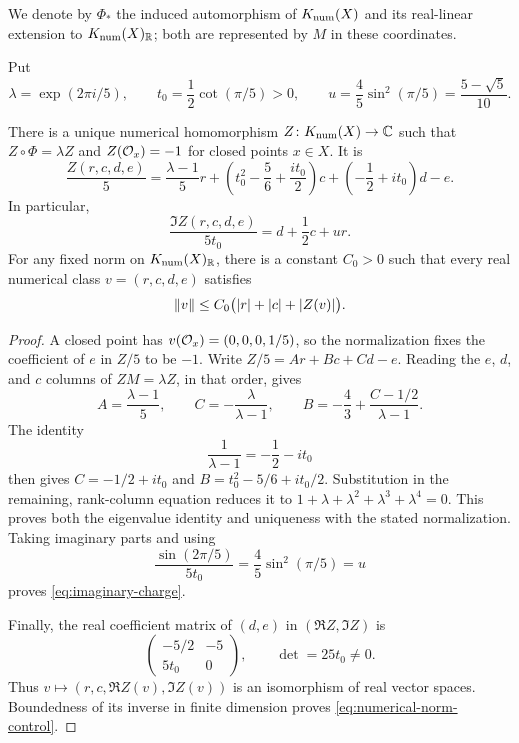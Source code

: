 We denote by $\Phi_*$ the induced automorphism of $K_{\mathrm{num}}(X)$ and its
real-linear extension to $K_{\mathrm{num}}(X)_{\mathbb R}$; both are represented by $M$ in
these coordinates.

Put
\begin{equation}\label{eq:charge-constants}
 \lambda=\exp(2\pi i/5),\qquad
 t_0=\frac12\cot(\pi/5)>0,\qquad
 u=\frac45\sin^2(\pi/5)=\frac{5-\sqrt5}{10}.
\end{equation}

\begin{proposition}\label{prop:central-charge}
There is a unique numerical homomorphism $Z\colon K_{\mathrm{num}}(X)\to\mathbb C$
such that $Z\circ\Phi=\lambda Z$ and $Z(\mathcal O_x)=-1$ for closed points
$x\in X$. It is
\begin{equation}\label{eq:central-charge}
 \frac{Z(r,c,d,e)}5
  =\frac{\lambda-1}{5}r
   +\left(t_0^2-\frac56+\frac{i t_0}{2}\right)c
   +\left(-\frac12+i t_0\right)d-e.
\end{equation}
In particular,
\begin{equation}\label{eq:imaginary-charge}
 \frac{\Im Z(r,c,d,e)}{5t_0}=d+\frac12c+ur.
\end{equation}
For any fixed norm on $K_{\mathrm{num}}(X)_{\mathbb R}$, there is a constant $C_0>0$
such that every real numerical class $v=(r,c,d,e)$ satisfies
\begin{equation}\label{eq:numerical-norm-control}
 \left\lVert v\right\rVert\le C_0\bigl(|r|+|c|+|Z(v)|\bigr).
\end{equation}
\end{proposition}

\begin{proof}
A closed point has $v(\mathcal O_x)=(0,0,0,1/5)$, so the normalization fixes
the coefficient of $e$ in $Z/5$ to be $-1$.
Write $Z/5=Ar+Bc+Cd-e$. Reading the $e$, $d$, and $c$ columns of
$ZM=\lambda Z$, in that order, gives
\[
 A=\frac{\lambda-1}{5},\qquad
 C=-\frac{\lambda}{\lambda-1},\qquad
 B=-\frac43+\frac{C-1/2}{\lambda-1}.
\]
The identity
\[
 \frac1{\lambda-1}=-\frac12-i t_0
\]
then gives $C=-1/2+i t_0$ and
$B=t_0^2-5/6+i t_0/2$. Substitution in the remaining, rank-column
equation reduces it to
$1+\lambda+\lambda^2+\lambda^3+\lambda^4=0$.
This proves both the eigenvalue identity and uniqueness with the stated
normalization. Taking imaginary parts and using
\[
 \frac{\sin(2\pi/5)}{5t_0}
       =\frac45\sin^2(\pi/5)=u
\]
proves \eqref{eq:imaginary-charge}.

Finally, the real coefficient matrix of $(d,e)$ in
$(\Re Z,\Im Z)$ is
\[
 \begin{pmatrix}-5/2&-5\\5t_0&0\end{pmatrix},
 \qquad \det=25t_0\ne0.
\]
Thus $v\mapsto(r,c,\Re Z(v),\Im Z(v))$ is an isomorphism of real
vector spaces. Boundedness of its inverse in finite dimension proves
\eqref{eq:numerical-norm-control}.
\end{proof}

